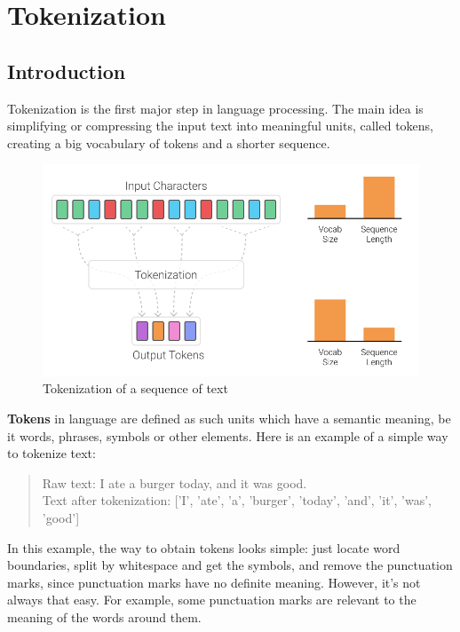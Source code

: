 %
%

\chapter{Tokenization}\label{sec:tokenization}

\section{Introduction}

Tokenization is the first major step in language processing. The main idea is simplifying or compressing the input text into meaningful units, called tokens, creating a big vocabulary of tokens and a shorter sequence.~\cite{manning2008introduction}

\begin{figure}[!ht]
    \centering
    \includegraphics[width=14cm]{figures/tokenization.png}
    \caption{Tokenization of a sequence of text}
\end{figure}

\textbf{Tokens} in language are defined as such units which have a semantic meaning, be it words, phrases, symbols or other elements. Here is an example of a simple way to tokenize text:

\begin{quote}
    Raw text: I ate a burger today, and it was good.\\
    Text after tokenization: ['I', 'ate', 'a', 'burger', 'today', 'and', 'it', 'was', 'good']
\end{quote}

In this example, the way to obtain tokens looks simple: just locate word boundaries, split by whitespace and get the symbols, and remove the punctuation marks, since punctuation marks have no definite meaning. However, it's not always that easy. For example, some punctuation marks are relevant to the meaning of the words around them.

